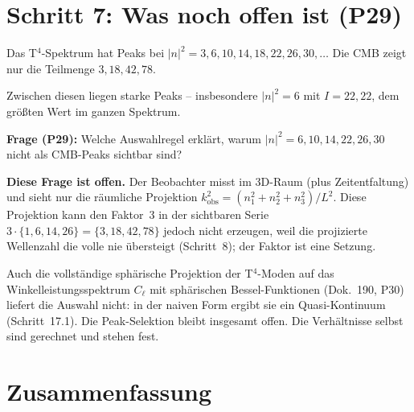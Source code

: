 \section{Schritt 7: Was noch offen ist (P29)}

Das T$^4$-Spektrum hat Peaks bei $|n|^2 = 3, 6, 10, 14, 18, 22, 26, 30, \ldots$
Die CMB zeigt nur die Teilmenge $3, 18, 42, 78$.

Zwischen diesen liegen starke Peaks -- insbesondere $|n|^2 = 6$ mit
$I = 22{,}22$, dem größten Wert im ganzen Spektrum.

\textbf{Frage (P29):} Welche Auswahlregel erklärt, warum
$|n|^2 = 6, 10, 14, 22, 26, 30$ nicht als CMB-Peaks sichtbar sind?

\textbf{Diese Frage ist offen.} Der Beobachter misst im 3D-Raum (plus
Zeitentfaltung) und sieht nur die räumliche Projektion
$k_\mathrm{obs}^2 = (n_1^2 + n_2^2 + n_3^2)/L^2$. Diese Projektion kann den
Faktor~3 in der sichtbaren Serie $3\cdot\{1,6,14,26\} = \{3,18,42,78\}$
jedoch nicht erzeugen, weil die projizierte Wellenzahl die volle nie
übersteigt (Schritt~8); der Faktor ist eine Setzung.

Auch die vollständige sphärische Projektion der T$^4$-Moden auf das
Winkelleistungsspektrum $C_\ell$ mit sphärischen Bessel-Funktionen
(Dok.~190, P30) liefert die Auswahl nicht: in der naiven Form ergibt sie ein
Quasi-Kontinuum (Schritt~17.1). Die Peak-Selektion bleibt insgesamt offen.
Die Verhältnisse selbst sind gerechnet und stehen fest.

\section{Zusammenfassung}

